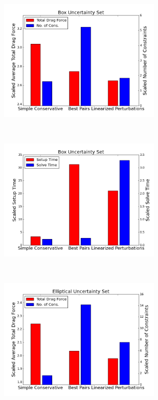 \begin{figure}[ht]
    \centering
    \captionsetup{justification=centering, font=small}
    \begin{subfigure}{0.499\textwidth}
        \centering
        \includegraphics[height=2.3in]{signomial_simple_flight/box.png}
    \end{subfigure}%
    ~ 
    \begin{subfigure}{0.49\textwidth}
        \centering
        \includegraphics[height=2.3in]{signomial_simple_flight/box_times.png}
    \end{subfigure}
    ~
    \begin{subfigure}{0.499\textwidth}
        \centering
        \includegraphics[height=2.3in]{signomial_simple_flight/ell.png}

\end{subfigure}
\end{figure}
